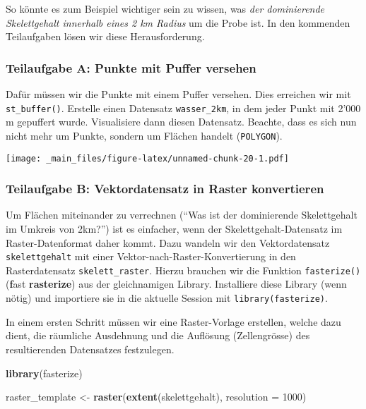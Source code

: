 \documentclass[]{book}
\newenvironment{Shaded}{\begin{snugshade}}{\end{snugshade}}
\newcommand{\DataTypeTok}[1]{\textcolor[rgb]{0.13,0.29,0.53}{#1}}
\newcommand{\DecValTok}[1]{\textcolor[rgb]{0.00,0.00,0.81}{#1}}
\newcommand{\KeywordTok}[1]{\textcolor[rgb]{0.13,0.29,0.53}{\textbf{#1}}}
\newcommand{\NormalTok}[1]{#1}
\newcommand{\StringTok}[1]{\textcolor[rgb]{0.31,0.60,0.02}{#1}}
\begin{document}
So könnte es zum Beispiel wichtiger sein zu wissen, was \emph{der dominierende Skelettgehalt innerhalb eines 2 km Radius} um die Probe ist. In den kommenden Teilaufgaben lösen wir diese Herausforderung.

\hypertarget{teilaufgabe-a-punkte-mit-puffer-versehen}{%
\subsubsection{Teilaufgabe A: Punkte mit Puffer versehen}\label{teilaufgabe-a-punkte-mit-puffer-versehen}}

Dafür müssen wir die Punkte mit einem Puffer versehen. Dies erreichen wir mit \texttt{st\_buffer()}. Erstelle einen Datensatz \texttt{wasser\_2km}, in dem jeder Punkt mit 2'000 m gepuffert wurde. Visualisiere dann diesen Datensatz. Beachte, dass es sich nun nicht mehr um Punkte, sondern um Flächen handelt (\texttt{POLYGON}).

\texttt{[image: \_main\_files/figure-latex/unnamed-chunk-20-1.pdf]}

\hypertarget{teilaufgabe-b-vektordatensatz-in-raster-konvertieren}{%
\subsubsection{Teilaufgabe B: Vektordatensatz in Raster konvertieren}\label{teilaufgabe-b-vektordatensatz-in-raster-konvertieren}}

Um Flächen miteinander zu verrechnen (``Was ist der dominierende Skelettgehalt im Umkreis von 2km?'') ist es einfacher, wenn der Skelettgehalt-Datensatz im Raster-Datenformat daher kommt. Dazu wandeln wir den Vektordatensatz \texttt{skelettgehalt} mit einer Vektor-nach-Raster-Konvertierung in den Rasterdatensatz \texttt{skelett\_raster}. Hierzu brauchen wir die Funktion \texttt{fasterize()} (\textbf{f}ast \textbf{rasterize}) aus der gleichnamigen Library. Installiere diese Library (wenn nötig) und importiere sie in die aktuelle Session mit \texttt{library(fasterize)}.

In einem ersten Schritt müssen wir eine Raster-Vorlage erstellen, welche dazu dient, die räumliche Ausdehnung und die Auflösung (Zellengrösse) des resultierenden Datensatzes festzulegen.

\begin{Shaded}
\begin{Highlighting}[]
\KeywordTok{library}\NormalTok{(fasterize)}

\NormalTok{raster_template <-}\StringTok{ }\KeywordTok{raster}\NormalTok{(}\KeywordTok{extent}\NormalTok{(skelettgehalt), }\DataTypeTok{resolution =} \DecValTok{1000}\NormalTok{)}
\end{Highlighting}
\end{Shaded}
\end{document}
